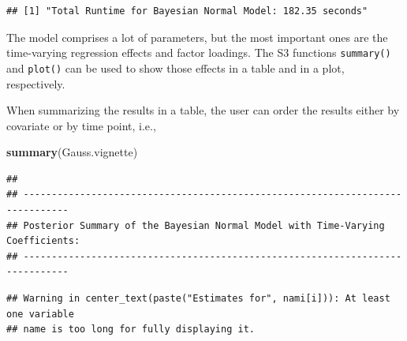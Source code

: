 \documentclass[a4paper, preprint, 3p,
authoryear]{elsarticle} %
\newenvironment{Shaded}{\begin{snugshade}}{\end{snugshade}}
\newcommand{\FunctionTok}[1]{\textcolor[rgb]{0.13,0.29,0.53}{\textbf{#1}}}
\newcommand{\NormalTok}[1]{#1}
\begin{document}
\begin{verbatim}
## [1] "Total Runtime for Bayesian Normal Model: 182.35 seconds"
\end{verbatim}

The model comprises a lot of parameters, but the most important ones are
the time-varying regression effects and factor loadings. The S3
functions \texttt{summary()} and \texttt{plot()} can be used to show
those effects in a table and in a plot, respectively.

When summarizing the results in a table, the user can order the results
either by covariate or by time point, i.e.,

\begin{Shaded}
\begin{Highlighting}[]
\FunctionTok{summary}\NormalTok{(Gauss.vignette)}
\end{Highlighting}
\end{Shaded}

\begin{verbatim}
## 
## ------------------------------------------------------------------------------
## Posterior Summary of the Bayesian Normal Model with Time-Varying Coefficients:
## ------------------------------------------------------------------------------
\end{verbatim}

\begin{verbatim}
## Warning in center_text(paste("Estimates for", nami[i])): At least one variable
## name is too long for fully displaying it.
\end{verbatim}
\end{document}
